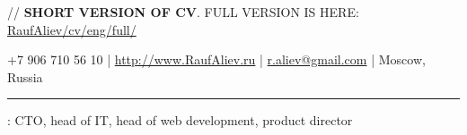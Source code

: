 \documentclass[11pt]{article}
\newif\ifdetailed
\begin{document}
%
\ifdetailed
{\small{// {\textbf{DETAILED VERSION OF CV}}. {\color{gray} COMPACT VERSION IS HERE: \href{http://RaufAliev.ru/cv/eng}{RaufAliev/cv/eng/}}}}
\else
{\small{// {\textbf{SHORT VERSION OF CV}}. {\color{gray} FULL VERSION IS HERE: \href{http://RaufAliev.ru/cv/eng/full/}{RaufAliev/cv/eng/full/}}}}
\fi

\vspace{0.5em}

\noindent +7 906 710 56 10    |    \url{http://www.RaufAliev.ru}   |   \href{mailto:r.aliev@gmail.com}{r.aliev@gmail.com}  |  Moscow, Russia  \ifdetailed | Jan 2, 1978 \fi

\vspace{0.5em}

\hrule

\vspace{1.5em}

\ifdetailed
\noindent {\textbf{CAREER OBJECTIVE}}: To work in a dynamic/established company in IT related role (IT director, CTO, IT{}manager, project manager, solution architect, development manager, or functional/technical/pre-sales consultant) on consulting, development, or operations. Preferably working in Web, e-commerce, retail, but open to other industry, challenge and opportunities.
\else
{}: CTO, head of IT, head of web development, product director
\fi

\vspace{1em}
\end{document}
